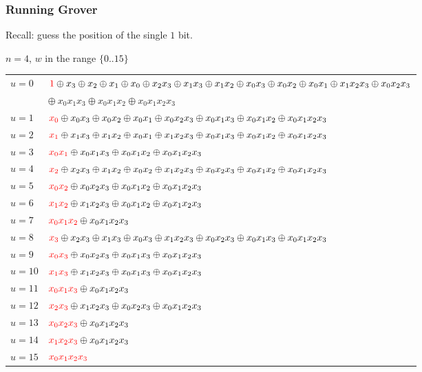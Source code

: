 \documentclass{beamer}
\newcommand{\red}[1]{{\color{red}{#1}}}
\begin{document}
\begin{frame}
  \frametitle{Running Grover}
  Recall: guess the position of the single $1$ bit.

\vspace*{4mm}
$n=4$, $w$ in the range $\{0..15\}$
{\tiny
\begin{tabular}{ll}
$u=0$ & 
  $\red{1} \oplus x_3 \oplus x_2 \oplus x_1 \oplus x_0 \oplus x_2x_3 \oplus x_1x_3 \oplus x_1x_2 \oplus x_0x_3 \oplus x_0x_2 \oplus x_0x_1 \oplus x_1x_2x_3 \oplus x_0x_2x_3$ \\
   &\quad $\oplus ~x_0x_1x_3 \oplus x_0x_1x_2 \oplus x_0x_1x_2x_3$ \\
$u=1$ & 
  $\red{x_0} \oplus x_0x_3 \oplus x_0x_2 \oplus x_0x_1 \oplus x_0x_2x_3 \oplus x_0x_1x_3 \oplus x_0x_1x_2 \oplus x_0x_1x_2x_3$ \\
$u=2$ &
  $\red{x_1} \oplus x_1x_3 \oplus x_1x_2 \oplus x_0x_1 \oplus x_1x_2x_3 \oplus x_0x_1x_3 \oplus x_0x_1x_2 \oplus x_0x_1x_2x_3$ \\
$u=3$ &
  $\red{x_0x_1} \oplus x_0x_1x_3 \oplus x_0x_1x_2 \oplus x_0x_1x_2x_3$ \\
$u=4$ &
  $\red{x_2} \oplus x_2x_3 \oplus x_1x_2 \oplus x_0x_2 \oplus x_1x_2x_3 \oplus x_0x_2x_3 \oplus x_0x_1x_2 \oplus x_0x_1x_2x_3$ \\
$u=5$ &
  $\red{x_0x_2} \oplus x_0x_2x_3 \oplus x_0x_1x_2 \oplus x_0x_1x_2x_3$ \\
$u=6$ &
  $\red{x_1x_2} \oplus x_1x_2x_3 \oplus x_0x_1x_2 \oplus x_0x_1x_2x_3$ \\
$u=7$ &
  $\red{x_0x_1x_2} \oplus x_0x_1x_2x_3$ \\
$u=8$ &
  $\red{x_3} \oplus x_2x_3 \oplus x_1x_3 \oplus x_0x_3 \oplus x_1x_2x_3 \oplus x_0x_2x_3 \oplus x_0x_1x_3 \oplus x_0x_1x_2x_3$ \\
$u=9$ &
  $\red{x_0x_3} \oplus x_0x_2x_3 \oplus x_0x_1x_3 \oplus x_0x_1x_2x_3$ \\
$u=10$ &
  $\red{x_1x_3} \oplus x_1x_2x_3 \oplus x_0x_1x_3 \oplus x_0x_1x_2x_3$ \\
$u=11$ &
  $\red{x_0x_1x_3} \oplus x_0x_1x_2x_3$ \\
$u=12$ &
  $\red{x_2x_3} \oplus x_1x_2x_3 \oplus x_0x_2x_3 \oplus x_0x_1x_2x_3$ \\
$u=13$ &
  $\red{x_0x_2x_3} \oplus x_0x_1x_2x_3$ \\
$u=14$ &
  $\red{x_1x_2x_3} \oplus x_0x_1x_2x_3$ \\
$u=15$ &
  $\red{x_0x_1x_2x_3}$
\end{tabular}
  }

\end{frame}
\end{document}
